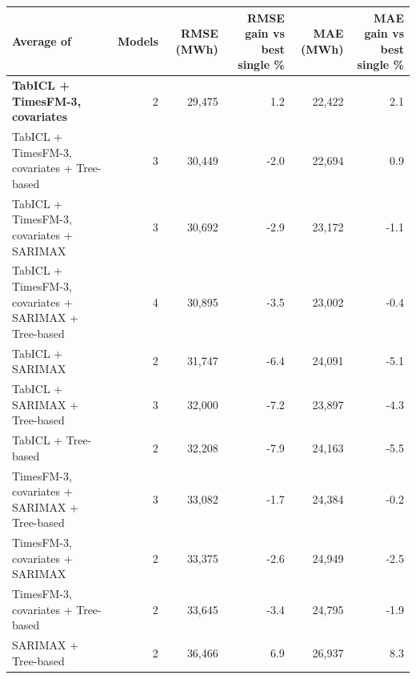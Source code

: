 \begin{tabular}{lrrrrr}
\toprule
Average of & Models & RMSE (MWh) & RMSE gain vs best single \% & MAE (MWh) & MAE gain vs best single \% \\
\midrule
\textbf{TabICL + TimesFM-3, covariates} & 2 & 29,475 & 1.2 & 22,422 & 2.1 \\
TabICL + TimesFM-3, covariates + Tree-based & 3 & 30,449 & -2.0 & 22,694 & 0.9 \\
TabICL + TimesFM-3, covariates + SARIMAX & 3 & 30,692 & -2.9 & 23,172 & -1.1 \\
TabICL + TimesFM-3, covariates + SARIMAX + Tree-based & 4 & 30,895 & -3.5 & 23,002 & -0.4 \\
TabICL + SARIMAX & 2 & 31,747 & -6.4 & 24,091 & -5.1 \\
TabICL + SARIMAX + Tree-based & 3 & 32,000 & -7.2 & 23,897 & -4.3 \\
TabICL + Tree-based & 2 & 32,208 & -7.9 & 24,163 & -5.5 \\
TimesFM-3, covariates + SARIMAX + Tree-based & 3 & 33,082 & -1.7 & 24,384 & -0.2 \\
TimesFM-3, covariates + SARIMAX & 2 & 33,375 & -2.6 & 24,949 & -2.5 \\
TimesFM-3, covariates + Tree-based & 2 & 33,645 & -3.4 & 24,795 & -1.9 \\
SARIMAX + Tree-based & 2 & 36,466 & 6.9 & 26,937 & 8.3 \\
\bottomrule
\end{tabular}
